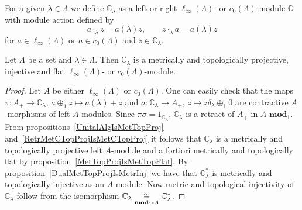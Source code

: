 For a given $\lambda\in\Lambda$ we define $\mathbb{C}_\lambda$ as a left or right
$\ell_\infty(\Lambda)$- or $c_0(\Lambda)$-module $\mathbb{C}$ with module action
defined by
\[
a\cdot_\lambda z=a(\lambda)z,\qquad z\cdot_\lambda a=a(\lambda) z
\]
for $a\in \ell_\infty(\Lambda)$ or $a\in c_0(\Lambda)$ and $z\in\mathbb{C}_\lambda$. 

\begin{proposition}\label{OneDimlInftyc0ModMetTopProjIngFlat} Let $\Lambda$ be a
set and $\lambda\in\Lambda$. Then $\mathbb{C}_\lambda$ is a metrically and
topologically projective, injective and flat $\ell_\infty(\Lambda)$- or
$c_0(\Lambda)$-module.
\end{proposition}
\begin{proof} Let $A$ be either $\ell_\infty(\Lambda)$ or $c_0(\Lambda)$. One
can easily check that the 
maps $\pi:A_+\to\mathbb{C}_\lambda,\, a\oplus_1 z\mapsto a(\lambda)+z$ 
and $\sigma:\mathbb{C}_\lambda\to A_+,\, z\mapsto z\delta_\lambda\oplus_1 0$ 
are contractive $A$-morphisms of left $A$-modules.
Since $\pi\sigma=1_{\mathbb{C}_\lambda}$, $\mathbb{C}_\lambda$ is a retract
of $A_+$ in $A\text{-}\mathbf{mod}_1$. From propositions~\ref{UnitalAlgIsMetTopProj}
and~\ref{RetrMetCTopProjIsMetCTopProj} it follows that $\mathbb{C}_\lambda$ is a 
metrically and topologically projective left $A$-module and a fortiori
metrically and topologically flat by proposition~\ref{MetTopProjIsMetTopFlat}.
By proposition~\ref{DualMetTopProjIsMetrInj} we have that $\mathbb{C}_\lambda^*$
is metrically and topologically injective as an $A$-module. Now metric and
topological injectivity of $\mathbb{C}_\lambda$ follow from the isomorphism
$\mathbb{C}_\lambda\mathrel{\mathop{\cong}\limits_{\mathbf{mod}_1\text{-}A}}\mathbb{C}_\lambda^*$.
\end{proof}

